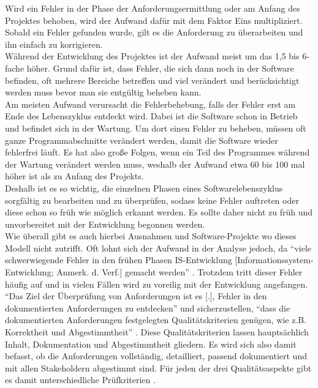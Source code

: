 \documentclass [12pt, a4paper, oneside, titlepage, ngerman]{article}
\begin{document}
\noindent Wird ein Fehler in der Phase der Anforderungsermittlung oder am Anfang des Projektes behoben, wird der Aufwand dafür mit dem Faktor Eins multipliziert. Sobald ein Fehler gefunden wurde, gilt es die Anforderung zu überarbeiten und ihn einfach zu korrigieren.\\
Während der Entwicklung des Projektes ist der Aufwand meist um das 1,5 bis 6-fache höher. Grund dafür ist, dass Fehler, die sich dann noch in der Software befinden, oft mehrere Bereiche betreffen und viel verändert und berücksichtigt werden muss bevor man sie entgültig beheben kann.\\
Am meisten Aufwand verursacht die Fehlerbehebung, falls der Fehler erst am Ende des Lebenszyklus entdeckt wird. Dabei ist die Software schon in Betrieb und befindet sich in der Wartung. Um dort einen Fehler zu beheben, müssen oft ganze Programmabschnitte verändert werden, damit die Software wieder fehlerfrei läuft. Es hat also große Folgen, wenn ein Teil des Programmes während der Wartung verändert werden muss, weshalb der Aufwand etwa 60 bis 100 mal höher ist als zu Anfang des Projekts. \\
Deshalb ist es so wichtig, die einzelnen Phasen eines Softwarelebenszyklus sorgfältig zu bearbeiten und zu überprüfen, sodass keine Fehler auftreten oder diese schon so früh wie möglich erkannt werden. Es sollte daher nicht zu früh und unvorbereitet mit der Entwicklung begonnen werden.\\
Wie überall gibt es auch hierbei Ausnahmen und Software-Projekte wo dieses Modell nicht zutrifft. Oft lohnt sich der Aufwand in der Analyse jedoch, da "`viele schwerwiegende Fehler in den frühen Phasen IS-Entwicklung [Informationssystem-Entwicklung; Anmerk. d. Verf.] gemacht werden"' \cite[S.316]{Alpar2016}. Trotzdem tritt dieser Fehler häufig auf und in vielen Fällen wird zu voreilig mit der Entwicklung angefangen. \\
"`Das Ziel der Überprüfung von Anforderungen ist es [.], Fehler in den dokumentierten Anforderungen zu entdecken"' \cite[S.95]{PohlRupp2015} und sicherzustellen, "`dass die dokumentierten Anforderungen festgelegten Qualitätskriterien genügen, wie z.B. Korrektheit und Abgestimmtheit"' \cite[S.95]{PohlRupp2015}. Diese Qualitätskriterien lassen hauptsächlich Inhalt, Dokumentation und Abgestimmtheit gliedern. Es wird sich also damit befasst, ob die Anforderungen vollständig, detailliert, passend dokumentiert und mit allen Stakeholdern abgestimmt sind. Für jeden der drei Qualitätsaspekte gibt es damit unterschiedliche Prüfkriterien \cite[vgl.S. 97]{PohlRupp2015}.
\end{document}
